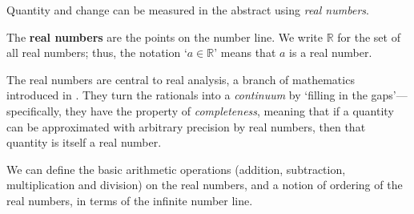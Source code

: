 Quantity and change can be measured in the abstract using \textit{real numbers}.

\begin{definition}
\label{defRealsInformal}
The \textbf{real numbers} are the points on the number line. We write $\mathbb{R}$  for the set of all real numbers; thus, the notation `$a \in \mathbb{R}$' means that $a$ is a real number.
\end{definition}

The real numbers are central to real analysis, a branch of mathematics introduced in . They turn the rationals into a \textit{continuum} by `filling in the gaps'---specifically, they have the property of \textit{completeness}, meaning that if a quantity can be approximated with arbitrary precision by real numbers, then that quantity is itself a real number.

We can define the basic arithmetic operations (addition, subtraction, multiplication and division) on the real numbers, and a notion of ordering of the real numbers, in terms of the infinite number line.


